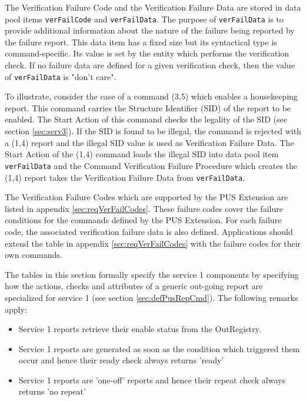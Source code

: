 \documentclass{pnp_article}
\begin{document}
The Verification Failure Code and the Verification Failure Data are stored in data pool items \texttt{verFailCode} and \texttt{verFailData}. The purpose of \texttt{verFailData} is to provide additional information about the nature of the failure being reported by the failure report. This data item has a fixed size but its syntactical type is command-specific. Its value is set by the entity which performs the verification check. If no failure data are defined for a given verification check, then the value of \texttt{verFailData} is "don't care". 

To illustrate, consider the case of a command (3,5) which enables a housekeeping report. This command carries the Structure Identifier (SID) of the report to be enabled. The Start Action of this command checks the legality of the SID (see section \ref{sec:serv3}). If the SID is found to be illegal, the command is rejected with a (1,4) report and the illegal SID value is used as Verification Failure Data. The Start Action of the (1,4) command loads the illegal SID into data pool item \texttt{verFailData} and the Command Verification Failure Procedure which creates the (1,4) report takes the Verification Failure Data from \texttt{verFailData}.

The Verification Failure Codes which are supported by the PUS Extension are listed in appendix \ref{sec:reqVerFailCodes}. These failure codes cover the failure conditions for the commands defined by the PUS Extension. For each failure code, the associated verification failure data is also defined. Applications should extend the table in appendix \ref{sec:reqVerFailCodes} with the failure codes for their own commands. 

The tables in this section formally specify the service 1 components by specifying how the actions, checks and attributes of a generic out-going report are specialized for service 1 (see section \ref{sec:defPusRepCmd}). The following remarks apply: 

\begin{itemize}
\item Service 1 reports retrieve their enable status from the OutRegistry.
\item Service 1 reports are generated as soon as the condition which triggered them occur and hence their ready check always returns 'ready'
\item Service 1 reports are 'one-off' reports and hence their repeat check always returns 'no repeat'
\end{itemize}
\end{document}
